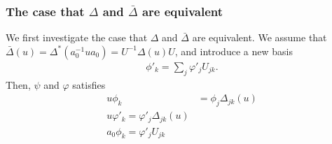\documentclass{article}
\begin{document}
\subsubsection{The case that $\Delta$ and $\bar{\Delta}$ are equivalent}
We first investigate the case that $\Delta$ and $\bar{\Delta}$ are equivalent.
We assume that $\bar{\Delta}(u) = \Delta^*(a_0^{-1} u a_0) = U^{-1} \Delta(u) U$, and introduce a new basis
\begin{align}
  \phi'_k = \sum_j \varphi'_j U_{jk}.
\end{align}
Then, $\psi$ and $\varphi$ satisfies
\begin{align}
  u \phi_k &= \phi_j \Delta_{jk} (u)
  \nonumber
  \\
  u \varphi'_k = \varphi'_j \Delta_{jk}(u)
  \nonumber
  \\
  a_0 \phi_k = \varphi'_j U_{jk}
\end{align}









\end{document}
